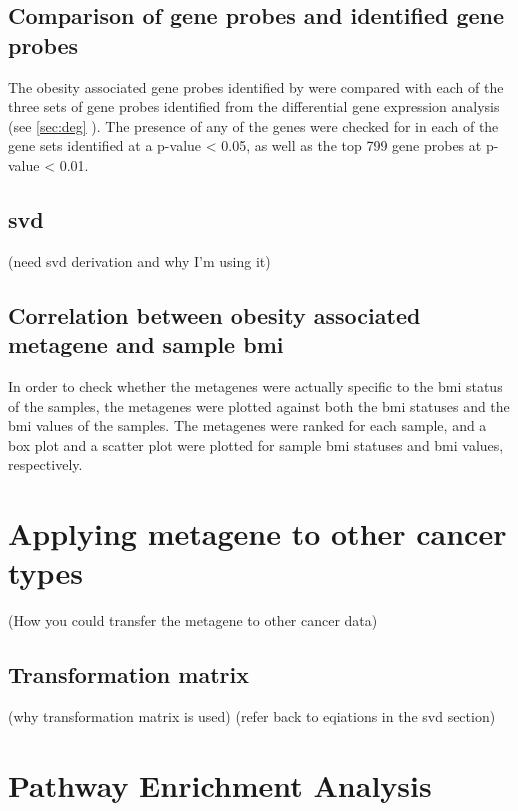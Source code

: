 \subsection{Comparison of \citet{Creighton2012} gene probes and identified gene probes}
\label{subsec:cfgeneprobes}

The obesity associated gene probes identified by \citet{Creighton2012} were compared with each of the three sets of gene probes identified from the differential gene expression analysis (see \cref{sec:deg} ).
The presence of any of the \citet{Creighton2012} genes were checked for in each of the gene sets identified at a p-value \textless{} 0.05, as well as the top 799 gene probes at p-value \textless{} 0.01.

\subsection{\gls{svd}}
\label{subsec:svd}

(need svd derivation and why I'm using it)

\subsection{Correlation between obesity associated metagene and sample \gls{bmi}}
\label{subsec:metavsbmi}

In order to check whether the metagenes were actually specific to the \gls{bmi} status of the samples, the metagenes were plotted against both the \gls{bmi} statuses and the \gls{bmi} values of the samples.
The metagenes were ranked for each sample, and a box plot and a scatter plot were plotted for sample \gls{bmi} statuses and \gls{bmi} values, respectively.

\section{Applying metagene to other cancer types}
\label{sec:metagene}

(How you could transfer the metagene to other cancer data)

\subsection{Transformation matrix}
\label{subsec:transmat}

(why transformation matrix is used)
(refer back to eqiations in the  svd section)

\section{Pathway Enrichment Analysis}
\label{sec:pathenrich}







